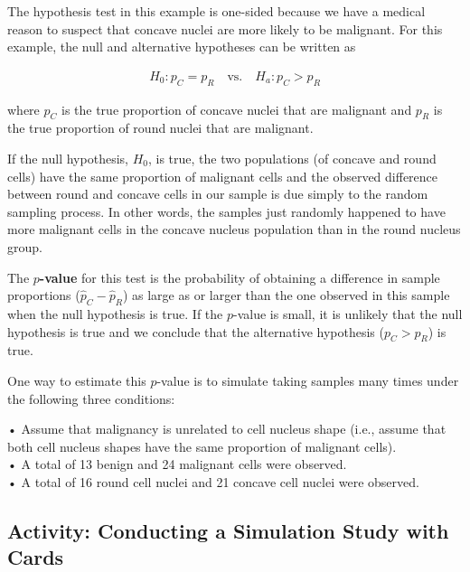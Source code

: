 \documentclass[
]{book}
\begin{document}
The hypothesis test in this example is one-sided because we have a medical reason to suspect that concave nuclei are more likely to be malignant. For this example, the null and alternative hypotheses can be written as

\begin{align}\label{5.1}
H_0: p_C = p_R \quad\text{vs.}\quad H_a: p_C > p_R 
\tag{5.1}
\end{align}

where \(p_C\) is the true proportion of concave nuclei that are malignant and \(p_R\) is the true proportion of round nuclei that are malignant.

If the null hypothesis, \(H_0\), is true, the two populations (of concave and round cells) have the same proportion of malignant cells and the observed difference between round and concave cells in our sample is due simply to the random sampling process. In other words, the samples just randomly happened to have more malignant cells in the concave nucleus population than in the round nucleus group.

The \textbf{\(p\)-value} for this test is the probability of obtaining a difference in sample proportions (\(\hat p_C - \hat p_R\)) as large as or larger than the one observed in this sample when the null hypothesis is true. If the \(p\)-value is small, it is unlikely that the null hypothesis is true and we conclude that the alternative hypothesis (\(p_C > p_R\)) is true.

One way to estimate this \(p\)-value is to simulate taking samples many times under the following three conditions:

• Assume that malignancy is unrelated to cell nucleus shape (i.e., assume that both cell nucleus shapes have the same proportion of malignant cells).\\
• A total of 13 benign and 24 malignant cells were observed.\\
• A total of 16 round cell nuclei and 21 concave cell nuclei were observed.

\hypertarget{activity-conducting-a-simulation-study-with-cards}{%
\subsection*{Activity: Conducting a Simulation Study with Cards}\label{activity-conducting-a-simulation-study-with-cards}}
\end{document}
